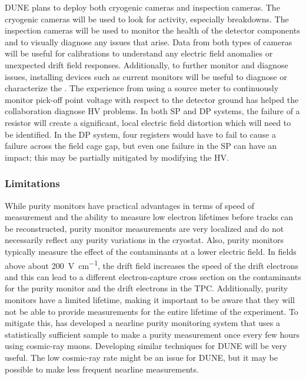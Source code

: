 DUNE plans to deploy both cryogenic cameras and inspection cameras. The cryogenic cameras will be used to look for  activity, especially breakdowns. The inspection cameras will be used to monitor the health of the detector components and to visually diagnose any issues that arise. %
Data from both types of cameras will be useful for calibrations to understand any electric field anomalies or unexpected drift field responses. Additionally, to further monitor and diagnose  issues, installing devices such as current monitors will be useful to diagnose or characterize the . The experience from \microboone using a source meter to continuously monitor pick-off point voltage with respect to the detector ground has helped the collaboration diagnose HV problems. In both SP and DP systems, the failure of a resistor will create a significant, local electric field distortion which will need to be identified. In the DP system, four registers would have to fail to cause a failure %
across the field cage gap, but even one failure in the SP can have an impact; this may be partially mitigated by modifying the HV.

\subsubsection{Limitations}
While purity monitors have practical advantages in terms of speed of measurement and the ability to measure low electron lifetimes before tracks can be reconstructed, purity monitor measurements are very localized and do not necessarily reflect any purity variations in the cryostat. Also, purity monitors typically measure the effect of the contaminants at a lower electric field. In fields above about \SI{200}{\V\per\cm}, the drift field increases the speed of the drift electrons 
and this can lead to a different electron-capture cross section on the contaminants for the purity monitor and the drift electrons in the TPC. Additionally, purity monitors %
have a limited lifetime, making it important to be aware that %
they will not be able to provide measurements for the entire lifetime of the experiment.
To mitigate this, \microboone has developed a nearline purity monitoring system that uses a statistically sufficient sample to make a purity measurement once every few hours using cosmic-ray muons. Developing similar techniques for DUNE will be very useful. The low cosmic-ray rate might be an issue for DUNE, but %
it may be possible to make less frequent nearline measurements. 

